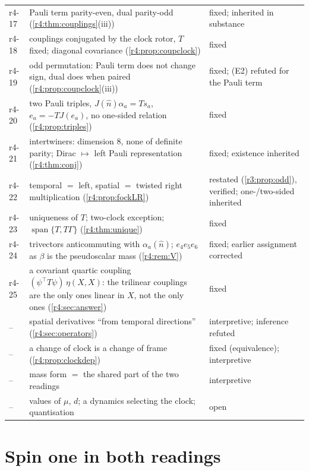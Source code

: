 {\begin{longtable}{@{}>{\raggedright\arraybackslash}p{}>{\raggedright\arraybackslash}p{}>{\raggedright\arraybackslash}p{}@{}}
r4-17 & Pauli term parity-even, dual parity-odd (\cref{r4:thm:couplings}(iii)) & fixed; inherited in substance\\
r4-18 & couplings conjugated by the clock rotor, $T$ fixed; diagonal covariance (\cref{r4:prop:coupclock}) & fixed\\
r4-19 & odd permutation: Pauli term does not change sign, dual does when paired (\cref{r4:prop:coupclock}(iii)) & fixed; (E2) refuted for the Pauli term\\
r4-20 & two Pauli triples, $J(\hat n)\alpha_a=Ts_a$, $e_a=-TJ(e_a)$, no one-sided relation (\cref{r4:prop:triples}) & fixed\\
r4-21 & intertwiners: dimension $8$, none of definite parity; Dirac $\mapsto$ left Pauli representation (\cref{r4:thm:conj}) & fixed; existence inherited\\
r4-22 & temporal $=$ left, spatial $=$ twisted right multiplication (\cref{r4:prop:fockLR}) & restated (\cref{r3:prop:odd}), verified; one-/two-sided inherited\\
r4-23 & uniqueness of $T$; two-clock exception; $\operatorname{span}\{T,T\Gamma\}$ (\cref{r4:thm:unique}) & fixed\\
r4-24 & trivectors anticommuting with $\alpha_a(\hat n)$; $e_4e_5e_6$ as $\beta$ is the pseudoscalar mass (\cref{r4:rem:V}) & fixed; earlier assignment corrected\\
r4-25 & a covariant quartic coupling $(\psi^{\!\top}T\psi)\,\eta(X,X)$: the trilinear couplings are the only ones linear in $X$, not the only ones (\cref{r4:sec:answer}) & fixed\\
-- & spatial derivatives ``from temporal directions'' (\cref{r4:sec:operators}) & interpretive; inference refuted\\
-- & a change of clock is a change of frame (\cref{r4:prop:clockdep}) & fixed (equivalence); interpretive\\
-- & mass form $=$ the shared part of the two readings & interpretive\\
-- & values of $\mu$, $d$; a dynamics selecting the clock; quantisation & open\\
\bottomrule
\end{longtable}}



\section{Spin one in both readings}
\label{sec:spin}

